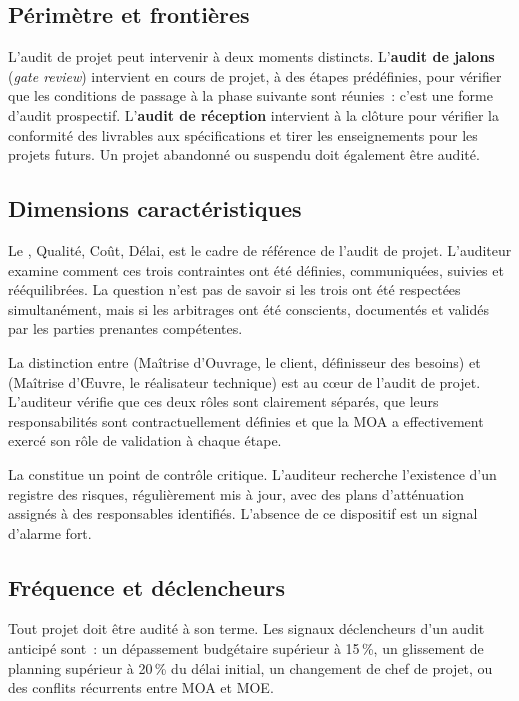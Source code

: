 \subsection{Périmètre et frontières}

L'audit de projet peut intervenir à deux moments distincts. L'\textbf{audit de jalons}
(\textit{gate review}) intervient en cours de projet, à des étapes prédéfinies, pour
vérifier que les conditions de passage à la phase suivante sont réunies~: c'est une
forme d'audit prospectif. L'\textbf{audit de réception} intervient à la clôture pour
vérifier la conformité des livrables aux spécifications et tirer les enseignements
pour les projets futurs. Un projet abandonné ou suspendu doit également être audité.

\subsection{Dimensions caractéristiques}

Le , Qualité, Coût, Délai, est le cadre de référence de
l'audit de projet. L'auditeur examine comment ces trois contraintes ont été définies,
communiquées, suivies et rééquilibrées. La question n'est pas de savoir si les trois
ont été respectées simultanément, mais si les arbitrages ont été conscients, documentés
et validés par les parties prenantes compétentes.

La distinction entre  (Maîtrise d'Ouvrage, le client, définisseur des
besoins) et  (Maîtrise d'Œuvre, le réalisateur technique) est au cœur
de l'audit de projet. L'auditeur vérifie que ces deux rôles sont clairement séparés,
que leurs responsabilités sont contractuellement définies et que la MOA a effectivement
exercé son rôle de validation à chaque étape.

La  constitue un point de contrôle critique.
L'auditeur recherche l'existence d'un registre des risques, régulièrement mis à jour,
avec des plans d'atténuation assignés à des responsables identifiés. L'absence de ce
dispositif est un signal d'alarme fort.

\subsection{Fréquence et déclencheurs}

Tout projet doit être audité à son terme. Les signaux déclencheurs d'un audit anticipé
sont~: un dépassement budgétaire supérieur à 15\,\%, un glissement de planning
supérieur à 20\,\% du délai initial, un changement de chef de projet, ou des conflits
récurrents entre MOA et MOE.

